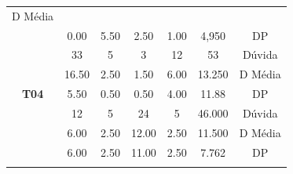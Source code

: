 \begin{table}[htbp]
\begin{tabular}{|ccccccc|}
		D Média \\ \cline{2-7} 
		\rowcolor[HTML]{D9D9D9} 
		\multicolumn{1}{|c|}{\multirow{-3}{*}{\cellcolor[HTML]{F2F2F2}\textbf{T03}}} &
		\multicolumn{1}{c|}{\cellcolor[HTML]{D9D9D9}0.00} &
		\multicolumn{1}{c|}{\cellcolor[HTML]{D9D9D9}5.50} &
		\multicolumn{1}{c|}{\cellcolor[HTML]{D9D9D9}2.50} &
		\multicolumn{1}{c|}{\cellcolor[HTML]{D9D9D9}1.00} &
		\multicolumn{1}{c|}{\cellcolor[HTML]{D9D9D9}4,950} &
		DP \\ \hline
		\multicolumn{1}{|c|}{\cellcolor[HTML]{F2F2F2}} &
		\multicolumn{1}{c|}{33} &
		\multicolumn{1}{c|}{5} &
		\multicolumn{1}{c|}{3} &
		\multicolumn{1}{c|}{12} &
		\multicolumn{1}{c|}{53} &
		Dúvida \\ \cline{2-7} 
		\rowcolor[HTML]{D9D9D9} 
		\multicolumn{1}{|c|}{\cellcolor[HTML]{F2F2F2}} &
		\multicolumn{1}{c|}{\cellcolor[HTML]{D9D9D9}16.50} &
		\multicolumn{1}{c|}{\cellcolor[HTML]{D9D9D9}2.50} &
		\multicolumn{1}{c|}{\cellcolor[HTML]{D9D9D9}1.50} &
		\multicolumn{1}{c|}{\cellcolor[HTML]{D9D9D9}6.00} &
		\multicolumn{1}{c|}{\cellcolor[HTML]{D9D9D9}13.250} &
		D Média \\ \cline{2-7} 
		\multicolumn{1}{|c|}{\multirow{-3}{*}{\cellcolor[HTML]{F2F2F2}\textbf{T04}}} &
		\multicolumn{1}{c|}{5.50} &
		\multicolumn{1}{c|}{0.50} &
		\multicolumn{1}{c|}{0.50} &
		\multicolumn{1}{c|}{4.00} &
		\multicolumn{1}{c|}{11.88} &
		DP \\ \hline
		\rowcolor[HTML]{D9D9D9} 
		\multicolumn{1}{|c|}{\cellcolor[HTML]{F2F2F2}} &
		\multicolumn{1}{c|}{\cellcolor[HTML]{D9D9D9}12} &
		\multicolumn{1}{c|}{\cellcolor[HTML]{D9D9D9}5} &
		\multicolumn{1}{c|}{\cellcolor[HTML]{D9D9D9}24} &
		\multicolumn{1}{c|}{\cellcolor[HTML]{D9D9D9}5} &
		\multicolumn{1}{c|}{\cellcolor[HTML]{D9D9D9}46.000} &
		Dúvida \\ \cline{2-7} 
		\multicolumn{1}{|c|}{\cellcolor[HTML]{F2F2F2}} &
		\multicolumn{1}{c|}{6.00} &
		\multicolumn{1}{c|}{2.50} &
		\multicolumn{1}{c|}{12.00} &
		\multicolumn{1}{c|}{2.50} &
		\multicolumn{1}{c|}{11.500} &
		D Média \\ \cline{2-7} 
		\rowcolor[HTML]{D9D9D9} 
		\multicolumn{1}{|c|}{\multirow{-3}{*}{\cellcolor[HTML]{F2F2F2}\textbf{T05}}} &
		\multicolumn{1}{c|}{\cellcolor[HTML]{D9D9D9}6.00} &
		\multicolumn{1}{c|}{\cellcolor[HTML]{D9D9D9}2.50} &
		\multicolumn{1}{c|}{\cellcolor[HTML]{D9D9D9}11.00} &
		\multicolumn{1}{c|}{\cellcolor[HTML]{D9D9D9}2.50} &
		\multicolumn{1}{c|}{\cellcolor[HTML]{D9D9D9}7.762} &
		DP \\ \hline
		\multicolumn{1}{|c|}{\cellcolor[HTML]{F2F2F2}} &

\end{tabular}
\end{table}
